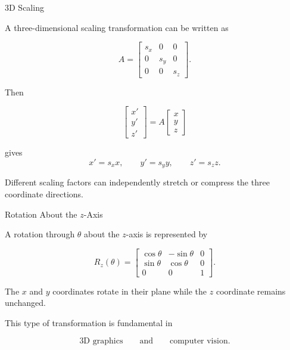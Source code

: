 
\begin{frame}{3D Scaling}

A three-dimensional scaling transformation can be written as

\[
A=
\begin{bmatrix}
s_x&0&0\\
0&s_y&0\\
0&0&s_z
\end{bmatrix}.
\]

Then

\[
\begin{bmatrix}
x'\\
y'\\
z'
\end{bmatrix}
=
A
\begin{bmatrix}
x\\
y\\
z
\end{bmatrix}
\]

gives
\vspace{-0.1cm}
\[
\boxed{
x'=s_xx,\qquad
y'=s_yy,\qquad
z'=s_zz.
}
\]

Different scaling factors can independently stretch or
compress the three coordinate directions.

\end{frame}



\begin{frame}{Rotation About the $z$-Axis}

A rotation through $\theta$ about the $z$-axis is represented by

\[
\boxed{
R_z(\theta)
=
\begin{bmatrix}
\cos\theta&-\sin\theta&0\\
\sin\theta&\cos\theta&0\\
0&0&1
\end{bmatrix}.
}
\]

\vspace{0.4cm}

The $x$ and $y$ coordinates rotate in their plane while
the $z$ coordinate remains unchanged.

\vspace{0.4cm}

This type of transformation is fundamental in

\[
\text{3D graphics}
\qquad\text{and}\qquad
\text{computer vision}.
\]

\end{frame}


